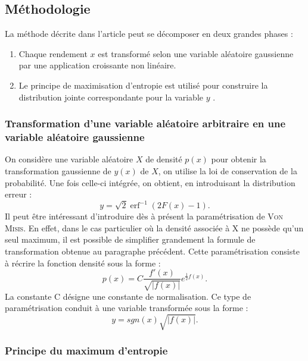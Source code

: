 \documentclass{article}
\DeclareMathOperator{\erf}{erf}
\begin{document}
\subsection{Méthodologie}

 La méthode décrite dans l'article peut se décomposer en deux grandes phases :
 \begin{enumerate}
 \item Chaque rendement $ x $ est transformé selon une variable aléatoire gaussienne par une application croissante non linéaire.
 \item  Le principe de  maximisation d'entropie est utilisé pour construire la distribution jointe correspondante pour la variable $ y $ . 
 \end{enumerate}
 
 \subsubsection{Transformation d'une variable aléatoire arbitraire en une variable aléatoire gaussienne}
 
On considère une variable aléatoire $ X $ de densité $ p(x) $ pour obtenir  la transformation gaussienne de $ y(x) $ de $ X $, on utilise la loi de conservation de la probabilité. Une fois celle-ci intégrée, on obtient, en introduisant la distribution erreur :
\begin{equation}
y=\sqrt{2}\erf^{-1}(2F(x)-1).
\end{equation}
 Il peut être intéressant d'introduire dès à présent la paramétrisation de \textsc{Von Misis}. En effet, dans le cas particulier où la densité associée à X ne possède qu'un seul maximum, il est possible de simplifier grandement la formule de transformation obtenue au paragraphe précédent. Cette paramétrisation consiste à récrire la fonction densité sous la forme : 
 \begin{equation}
 p(x)=C\frac{f'(x)}{\sqrt{\vert f(x)\vert }}e^{\frac{1}{2}f(x)}.
 \end{equation}
 La constante C désigne une constante de normalisation. Ce type de paramétrisation conduit à une variable transformée sous la forme :
 \begin{equation}
 y=sgn(x)\sqrt{\vert f(x)\vert}.
 \end{equation}
 
  \subsubsection{Principe du maximum d'entropie}
  
\end{document}
